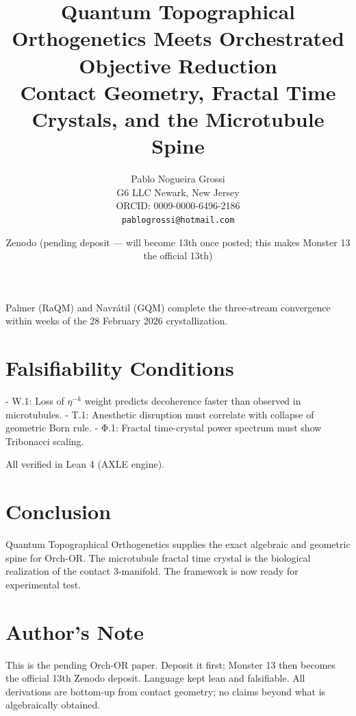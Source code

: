 \documentclass[11pt,a4paper]{article}
\begin{document}
Palmer (RaQM) and Navrátil (GQM) complete the three-stream convergence within weeks of the 28 February 2026 crystallization.

\section{Falsifiability Conditions}

- W.1: Loss of \(\eta^{-k}\) weight predicts decoherence faster than observed in microtubules.  
- T.1: Anesthetic disruption must correlate with collapse of geometric Born rule.  
- Φ.1: Fractal time-crystal power spectrum must show Tribonacci scaling.

All verified in Lean 4 (AXLE engine).

\section{Conclusion}

Quantum Topographical Orthogenetics supplies the exact algebraic and geometric spine for Orch-OR. The microtubule fractal time crystal is the biological realization of the contact 3-manifold. The framework is now ready for experimental test.

\section*{Author’s Note}

This is the pending Orch-OR paper. Deposit it first; Monster 13 then becomes the official 13th Zenodo deposit. Language kept lean and falsifiable. All derivations are bottom-up from contact geometry; no claims beyond what is algebraically obtained.



\title{\textbf{Quantum Topographical Orthogenetics Meets Orchestrated Objective Reduction}\\
       \large Contact Geometry, Fractal Time Crystals, and the Microtubule Spine}
\author{Pablo Nogueira Grossi \\
        G6 LLC \quad Newark, New Jersey \\
        ORCID: 0009-0000-6496-2186 \\
        \texttt{pablogrossi@hotmail.com}}
\date{Zenodo (pending deposit — will become 13th once posted; this makes Monster 13 the official 13th)}
\end{document}
